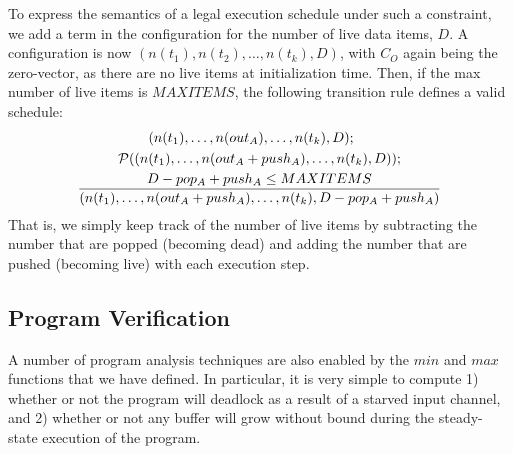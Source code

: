 To express the semantics of a legal execution schedule under such a
constraint, we add a term in the configuration for the number of live
data items, $D$.  A configuration is now $(n(t_1), n(t_2), \dots,
n(t_k), D)$, with $C_O$ again being the zero-vector, as there are no
live items at initialization time.  Then, if the max number of live
items is $MAXITEMS$, the following transition rule defines a valid
schedule:
%
%
%
\begin{align*}
& \hspace{0.7in} (n(t_1), \dots , n(out_A), \dots, n(t_k), D); \\ &
\hspace{0.4in} {\cal P}((n(t_1), \dots , n(out_A + push_A), \dots,
n(t_k), D)); \\ & \frac{D - pop_A + push_A \le MAXITEMS}{(n(t_1),
\dots , n(out_A + push_A),
\dots, n(t_k), D - pop_A + push_A)}
\end{align*}
That is, we simply keep track of the number of live items by
subtracting the number that are popped (becoming dead) and adding the
number that are pushed (becoming live) with each execution step.

\subsection{Program Verification}

A number of program analysis techniques are also enabled by the $min$
and $max$ functions that we have defined.  In particular, it is very
simple to compute 1) whether or not the program will deadlock as a
result of a starved input channel, and 2) whether or not any buffer
will grow without bound during the steady-state execution of the
program.

